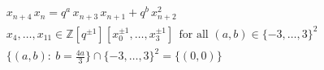 \documentclass{article}
\begin{document}
\[
\begin{aligned}
&x_{n+4}\,x_n=q^{a}\,x_{n+3}\,x_{n+1}+q^{b}\,x_{n+2}^{2}\\
&x_4,\dots,x_{11}\in\mathbb{Z}[q^{\pm1}][x_0^{\pm1},\dots,x_3^{\pm1}]\ \ \text{for all }(a,b)\in\{-3,\dots,3\}^{2}\\
&\{(a,b):\ b=\tfrac{4a}{3}\}\cap\{-3,\dots,3\}^{2}=\{(0,0)\}
\end{aligned}
\]
\end{document}
